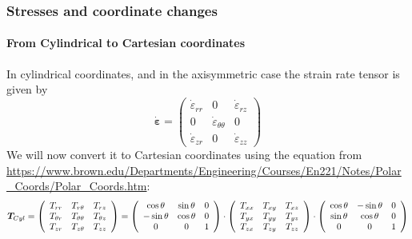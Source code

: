 \subsubsection*{Stresses and coordinate changes}

\paragraph{From Cylindrical to Cartesian coordinates}

In cylindrical coordinates, and in the axisymmetric case
the strain rate tensor is given by
\[
\dot{\bm\varepsilon}
=
\left(
\begin{array}{ccc}
\dot\varepsilon_{rr} & 0 & \dot{\varepsilon}_{rz} \\
0 & \dot{\varepsilon}_{\theta\theta}  & 0 \\
\dot{\varepsilon}_{zr} & 0 & \dot\varepsilon_{zz}
\end{array}
\right)
\]
We will now convert it to Cartesian coordinates using the equation from \url{https://www.brown.edu/Departments/Engineering/Courses/En221/Notes/Polar_Coords/Polar_Coords.htm}:
\[
{\bm T}_{\tiny Cyl}=
\left(
\begin{array}{ccc}
T_{rr}       & T_{r\theta}      & T_{rz} \\
T_{\theta r} & T_{\theta\theta} & T_{\theta z} \\
T_{z r}      & T_{z \theta}     & T_{zz}
\end{array}
\right)
=
\left(
\begin{array}{ccc}
 \cos \theta&\sin \theta&0 \\
-\sin \theta&\cos \theta&0 \\
0 & 0 & 1 
\end{array}
\right)
\cdot
\left(
\begin{array}{ccc}
T_{xx} & T_{xy} & T_{xz} \\
T_{yx} & T_{yy} & T_{yz} \\
T_{zx} & T_{zy} & T_{zz} 
\end{array}
\right)
\cdot
\left(
\begin{array}{ccc}
\cos \theta & -\sin \theta&0 \\
\sin \theta &  \cos \theta&0 \\
0 & 0 & 1 
\end{array}
\right)
\]

